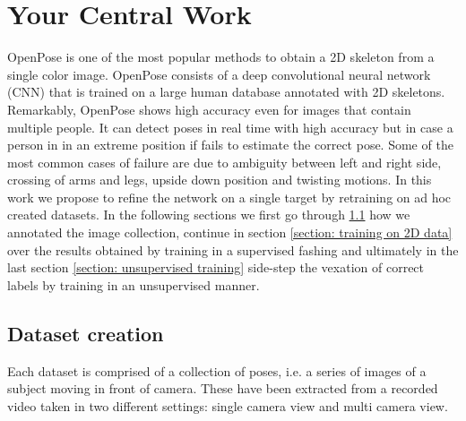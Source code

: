 \chapter{Your Central Work}
OpenPose \cite{8765346} is one of the most popular methods to obtain a 2D
skeleton from a single color image. OpenPose consists of a deep convolutional neural network (CNN) that is trained on a large human database annotated with 2D skeletons. Remarkably, OpenPose shows high accuracy  even for images that contain multiple people. It can detect poses in real time with high accuracy but in case a person in in an extreme position if fails to estimate the correct pose. Some of the most common cases of failure are due to ambiguity between left and right side, crossing of arms and legs, upside down position and twisting motions. 
In this work we propose to refine the network on a single target by retraining on ad hoc created datasets. 
In the following sections we first go through \ref{section: Dataset creation} how we annotated the image collection, continue in section \ref{section: training on 2D data} over the results obtained by training in a supervised fashing and ultimately in the last section \ref{section: unsupervised training} side-step the vexation of correct labels by training in an unsupervised manner. 

\section{Dataset creation}
\label{section: Dataset creation}
Each dataset is comprised of a collection of poses, i.e. a series of images of a subject moving in front of camera. These have been extracted from a recorded video taken in two different settings: single camera view and multi camera view. 

